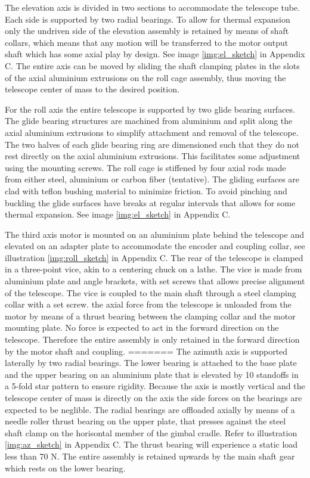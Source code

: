 The elevation axis is divided in two sections to accommodate the telescope tube. Each side is supported by two radial bearings. To allow for thermal expansion only the undriven side of the elevation assembly is retained by means of shaft collars, which means that any motion will be transferred to the motor output shaft which has some axial play by design. See image \ref{img:el_sketch} in Appendix C. The entire axis can be moved by sliding the shaft clamping plates in the slots of the axial aluminium extrusions on the roll cage assembly, thus moving the telescope center of mass to the desired position. 

For the roll axis the entire telescope is supported by two glide bearing surfaces. The glide bearing structures are machined from  aluminium and split along the axial aluminium extrusions to simplify attachment and removal of the telescope. The  two halves of each glide bearing ring are dimensioned such that they do not rest directly on the axial aluminium extrusions. This facilitates some adjustment using the mounting screws. The roll cage is stiffened by four axial rods made from either steel, aluminium or carbon fiber (tentative). The gliding surfaces are clad with teflon bushing material to minimize friction. To avoid pinching and buckling the glide surfaces have breaks at regular intervals that allows for some thermal expansion. See image \ref{img:el_sketch} in Appendix C. 

The third axis motor is mounted on an aluminium plate behind the telescope and elevated on an adapter plate to accommodate the encoder and coupling collar, see illustration \ref{img:roll_sketch} in Appendix C. The rear of the telescope is clamped in a three-point vice, akin to a centering chuck on a lathe. The vice is made from aluminium plate and angle brackets, with set screws that allows precise alignment of the telescope. The vice is coupled to the main shaft through a steel clamping collar with a set screw. the axial force from the telescope is unloaded from the motor by means of a thrust bearing between the clamping collar and the motor mounting plate. No force is expected to act in the forward direction on the telescope. Therefore the entire assembly is only retained in the forward direction by the motor shaft and coupling. 
=======
The azimuth axis is supported laterally by two radial bearings. The lower bearing is attached to the base plate and the upper bearing on an aluminium plate that is elevated by 10 standoffs in a 5-fold star pattern to ensure rigidity. Because the axis is mostly vertical and the telescope center of mass is directly on the axis the side forces on the bearings are expected to be neglible. The radial bearings are offloaded axially by means of a needle roller thrust bearing on the upper plate, that presses against the steel shaft clamp on the horisontal member of the gimbal cradle. Refer to illustration \ref{img:az_sketch} in Appendix C. The thrust bearing will experience a static load less than 70 N. The entire assembly is retained upwards by the main shaft gear which rests on the lower bearing.

